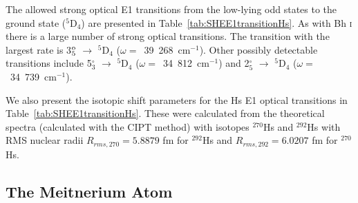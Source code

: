 \documentclass[10pt,a4paper, twoside, openright]{report}
\begin{document}
The allowed strong optical E1 transitions from the low-lying odd states to the ground state ($^5$D$_{4}$) are presented in Table~\ref{tab:SHEE1transitionHs}. As with Bh \textsc{i} there is a large number of strong optical transitions. The transition with the largest rate is 3$_5^{\rm o}$ $\rightarrow$ $^5$D$_{4}$ ($\omega =$~39~268~cm$^{-1}$). Other possibly detectable transitions include 5$_3^{\circ}$ $\rightarrow$ $^5$D$_{4}$ ($\omega =$~34~812~cm$^{-1}$) and 2$_5^{\circ}$ $\rightarrow$ $^5$D$_{4}$ ($\omega= $~34~739~cm$^{-1}$).

We also present the isotopic shift parameters for the Hs E1 optical transitions in Table~\ref{tab:SHEE1transitionHs}. These were calculated from the theoretical spectra (calculated with the CIPT method) with isotopes $^{270}$Hs and $^{292}$Hs with RMS nuclear radii $R_{rms,\text{270}} = 5.8879$ fm for $^{292}$Hs and $R_{rms,\text{292}} = 6.0207$ fm for $^{270}$Hs.

\subsection{The Meitnerium Atom} \label{sec:Mt}
\end{document}
